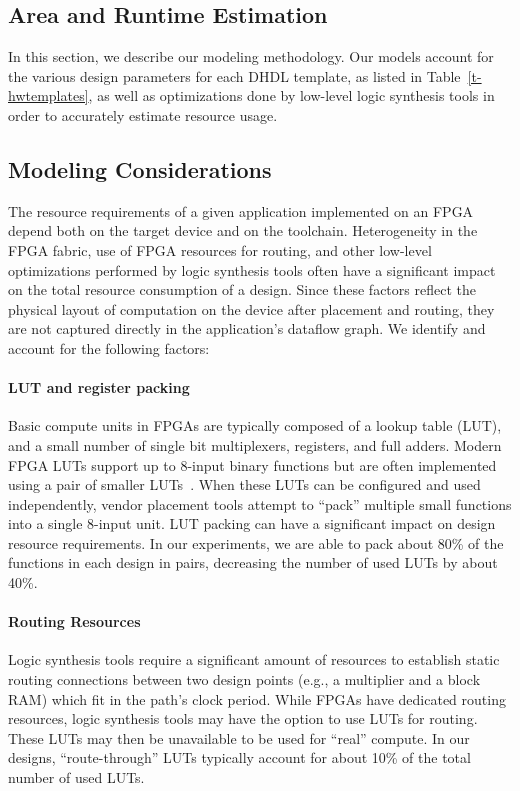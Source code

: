 \subsection{Area and Runtime Estimation}
\label{sec:modeling}
In this section, we describe our modeling methodology. Our models account for the various
design parameters for each DHDL template, as listed in Table~\ref{t-hwtemplates}, as well as optimizations done by low-level logic
synthesis tools in order to accurately estimate resource usage.

\subsection{Modeling Considerations}
\label{ss:modeling-con}
The resource requirements of a given application implemented on an FPGA depend both on the target device and on the toolchain.
Heterogeneity in the FPGA fabric, use of FPGA resources for routing, and other low-level optimizations performed by logic
synthesis tools often have a significant impact on the total resource consumption of a design. Since these factors reflect
the physical layout of computation on the device after placement and routing, they are not captured directly in the application's dataflow graph.
We identify and account for the following factors:

\paragraph{LUT and register packing} Basic compute units in FPGAs are typically composed of a lookup table (LUT), and a small number of single bit multiplexers, registers, and full adders.
  Modern FPGA LUTs support up to 8-input binary functions but are often implemented using a pair of smaller LUTs~\cite{stratixv,virtex7}.
  When these LUTs can be configured and used independently, vendor placement tools attempt to ``pack'' multiple small functions into a single 8-input unit.
  LUT packing can have a significant impact on design resource requirements.
  In our experiments, we are able to pack about 80\% of the functions in each design in pairs, decreasing the number of used LUTs by about 40\%.

\paragraph{Routing Resources} Logic synthesis tools require a significant amount of resources to establish static routing connections
between two design points (e.g., a multiplier and a block RAM) which fit in the path's clock period. While FPGAs have dedicated routing resources,
logic synthesis tools may have the option to use LUTs for routing. These LUTs may then be unavailable to be used for ``real'' compute.
In our designs, ``route-through'' LUTs typically account for about 10\% of the total number of used LUTs.


